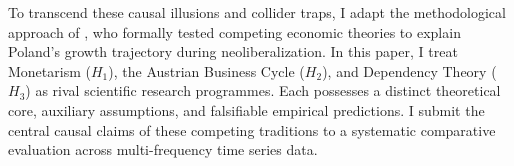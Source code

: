 To transcend these causal illusions and collider traps, I adapt the methodological approach of \citet{KingSznajder2006}, who formally tested competing economic theories to explain Poland's growth trajectory during neoliberalization. In this paper, I treat Monetarism ($H_1$), the Austrian Business Cycle ($H_2$), and Dependency Theory ($H_3$) as rival scientific research programmes. Each possesses a distinct theoretical core, auxiliary assumptions, and falsifiable empirical predictions. I submit the central causal claims of these competing traditions to a systematic comparative evaluation across multi-frequency time series data.
